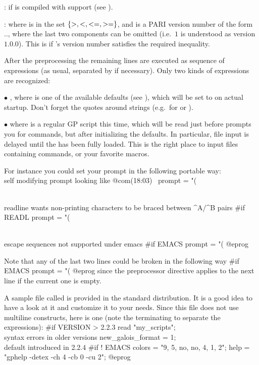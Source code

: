 :  if  is compiled with  support (see
).

  : where  is in the set
$\{ {\tt >}, {\tt <}, {\tt <=}, {\tt >=} \}$, and  is a PARI
version number of the form .., where the
last two components can be omitted (i.e.~$1$ is understood as version $1.0.0$).
This is  if 's version number satisfies the required
inequality.

After the preprocessing the remaining lines are executed as
sequence of expressions (as usual, separated by \kbd{;} if necessary). Only
two kinds of expressions are recognized:

$\bullet$  \kbd{=} , where  is one of
the available defaults (see ), which will be set to
 on actual startup. Don't forget the quotes around strings
(e.g.~for  or ).

$\bullet$  where 
is a regular GP script this time, which will be read just before  prompts
you for commands, but after initializing the defaults. In particular, file
input is delayed until the  has been fully loaded. This is the
right place to input files containing  commands, or your favorite
macros.

\noindent For instance you could set your prompt in the following portable way:
\bprog
\\ self modifying prompt looking like @com\hbox{\rm(18:03) \kbd{ >}}
prompt   = "(%

\\ readline wants non-printing characters to be braced between ^A/^B pairs
#if READL prompt = "(%

\\ escape sequences not supported under emacs
#if EMACS prompt = "(%
@eprog

\noindent Note that any of the last two lines could be broken in the
following way
\bprog
#if EMACS
  prompt = "(%
@eprog
\noindent since the preprocessor directive applies to the next line if the
current one is empty.

A sample  file called  is provided in the
standard distribution. It is a good idea to have a look at it and customize
it to your needs. Since this file does not use multiline constructs, here is
one (note the terminating \kbd{;} to separate the expressions):
\bprog
#if VERSION > 2.2.3
{
  read "my_scripts";     \\ syntax errors in older versions
  new_galois_format = 1; \\ default introduced in 2.2.4
}
#if ! EMACS
{
  colors = "9, 5, no, no, 4, 1, 2";
  help   = "gphelp -detex -ch 4 -cb 0 -cu 2";
}
@eprog

